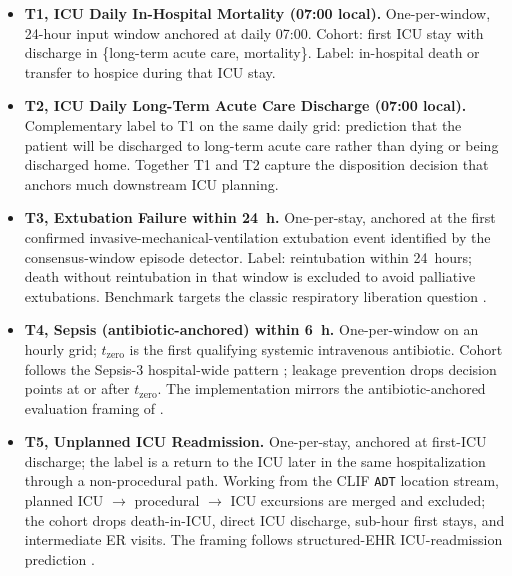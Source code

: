 \begin{itemize}[leftmargin=1.5em]
  \item \textbf{T1, ICU Daily In-Hospital Mortality (07:00 local).}
        One-per-window, 24-hour input window anchored at daily 07:00.
        Cohort: first ICU stay with discharge in
        \{long-term acute care, mortality\}. Label: in-hospital death
        or transfer to hospice during that ICU stay.
  \item \textbf{T2, ICU Daily Long-Term Acute Care Discharge
        (07:00 local).} Complementary label to T1 on the same daily
        grid: prediction that the patient will be discharged to
        long-term acute care rather than dying or being discharged
        home. Together T1 and T2 capture the disposition decision
        that anchors much downstream ICU planning.
  \item \textbf{T3, Extubation Failure within 24~h.} One-per-stay,
        anchored at the first confirmed invasive-mechanical-ventilation
        extubation event identified by the consensus-window episode
        detector. Label: reintubation within 24~hours; death without
        reintubation in that window is excluded to avoid palliative extubations.
        Benchmark targets the classic respiratory liberation question
        \citep{thille2011extubation}.
  \item \textbf{T4, Sepsis (antibiotic-anchored) within 6~h.}
        One-per-window on an hourly grid; $t_{\mathrm{zero}}$ is the
        first qualifying systemic intravenous antibiotic. Cohort follows
        the Sepsis-3 hospital-wide pattern \citep{singer2016sepsis3,seymour2016assessment,rhee2019sepsis};
        leakage prevention drops decision points at or after
        $t_{\mathrm{zero}}$. The implementation mirrors the
        antibiotic-anchored evaluation framing of
        \citet{kamran2024sepsis}.
  \item \textbf{T5, Unplanned ICU Readmission.} One-per-stay,
        anchored at first-ICU discharge; the label is a return to the
        ICU later in the same hospitalization through a non-procedural
        path. Working from the CLIF \texttt{ADT} location stream,
        planned ICU $\to$ procedural $\to$ ICU excursions are merged and
        excluded; the cohort drops death-in-ICU, direct ICU discharge,
        sub-hour first stays, and intermediate ER visits. The framing
        follows structured-EHR ICU-readmission prediction
        \citep{rojas2018readmission}.
\end{itemize}

